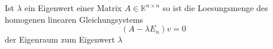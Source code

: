Ist $\lambda$ ein Eigenwert einer Matrix $A \in \mathbb{K}^{n \times n}$ so ist die Loesungsmenge des homogenen linearen Gleichungsystems
$$(A - \lambda E_n) v = 0$$
der Eigenraum zum Eigenwert $\lambda$
